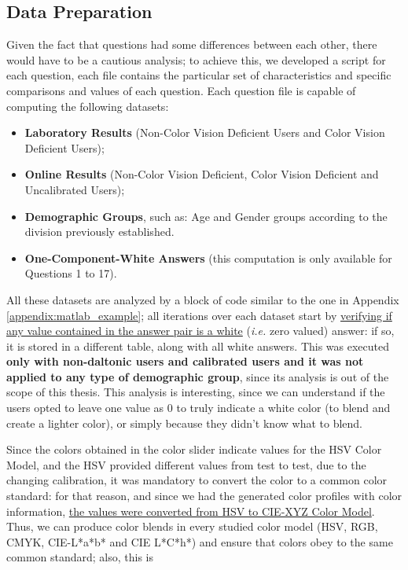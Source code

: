 \subsection{Data Preparation}
\label{subsec:results_preparation}
%
Given the fact that questions had some differences between each other, there would have to be a cautious analysis; to achieve this, we developed a script for each question, each
file contains the particular set of characteristics and specific comparisons and values of each question. Each question file is capable of computing the following datasets:
%
\begin{itemize}[noitemsep]
  \item \textbf{Laboratory Results} (Non-Color Vision Deficient Users and Color Vision Deficient Users);
  \item \textbf{Online Results} (Non-Color Vision Deficient, Color Vision Deficient and Uncalibrated Users);
  \item \textbf{Demographic Groups}, such as: Age and Gender groups according to the division previously established.
  \item \textbf{One-Component-White Answers} (this computation is only available for Questions 1 to 17).
\end{itemize} \par
%
All these datasets are analyzed by a block of code similar to the one in Appendix \ref{appendix:matlab_example}; all iterations over each dataset start by \ul{verifying if any value contained in
the answer pair is a white} (\emph{i.e.} zero valued) answer: if so, it is stored in a different table, along with all white answers. This was executed \textbf{only
with non-daltonic users and calibrated users and it was not applied to any type of demographic group}, since its analysis is out of the scope of this thesis. This analysis is
interesting, since we can understand if the users opted to leave one value as 0 to truly indicate a white color (to blend and create a lighter color), or simply because they
didn't know what to blend. \par
%
Since the colors obtained in the color slider indicate values for the HSV Color Model, and the HSV provided different values from test to test, due to the changing calibration, it was mandatory to
convert the color to a common color standard: for that reason, and since we had the generated color profiles with color information, \ul{the values were converted from HSV to CIE-XYZ Color Model}.
Thus, we can produce color blends in every studied color model (HSV, RGB, CMYK, CIE-L*a*b* and CIE L*C*h*) and ensure that colors obey to the same common standard; also, this is
